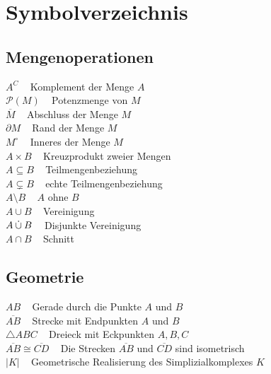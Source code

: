\twocolumn
\chapter*{Symbolverzeichnis}
\section*{Mengenoperationen}
$A^C\;\;\;$ Komplement der Menge $A$\\
$\mathcal{P}(M)\;\;\;$ Potenzmenge von $M$\\
$\overline{M}\;\;\;$ Abschluss der Menge $M$\\
$\partial M\;\;\;$ Rand der Menge $M$\\
$M^\circ\;\;\;$ Inneres der Menge $M$\\
$A \times B\;\;\;$ Kreuzprodukt zweier Mengen\\
$A \subseteq B\;\;\;$ Teilmengenbeziehung\\
$A \subsetneq B\;\;\;$ echte Teilmengenbeziehung\\
$A \setminus B\;\;\;$ $A$ ohne $B$\\
$A \cup B\;\;\;$ Vereinigung\\
$A \mathbin{\dot{\cup}} B\;\;\;$ Disjunkte Vereinigung\\
$A \cap B\;\;\;$ Schnitt\\
\section*{Geometrie}
$AB\;\;\;$ Gerade durch die Punkte $A$ und $B$\\
$\overline{AB}\;\;\;$ Strecke mit Endpunkten $A$ und $B$\\
$\triangle ABC\;\;\;$ Dreieck mit Eckpunkten $A, B, C$\\
$\overline{AB} \cong \overline{CD}\;\;\;$ Die Strecken $\overline{AB}$ und $\overline{CD}$ sind isometrisch\\
$|K|\;\;\;$ Geometrische Realisierung des Simplizialkomplexes $K$\\
